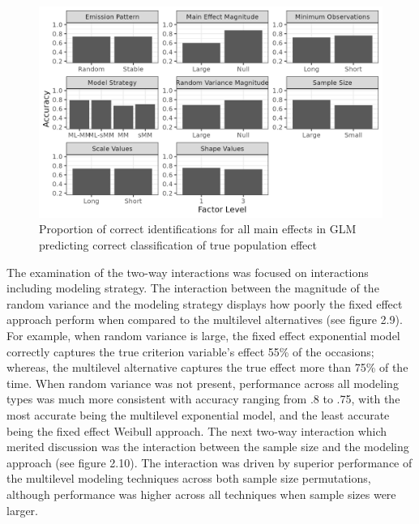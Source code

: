 \documentclass[12pt]{./styles/outhesis}
\begin{document}
\begin{figure}
\includegraphics{figures/glm1MainEffect.png}
\caption{Proportion of correct identifications for all main effects in
GLM predicting correct classification of true population effect}
\end{figure}

The examination of the two-way interactions was focused on interactions
including modeling strategy. The interaction between the magnitude of
the random variance and the modeling strategy displays how poorly the
fixed effect approach perform when compared to the multilevel
alternatives (see figure 2.9). For example, when random variance is
large, the fixed effect exponential model correctly captures the true
criterion variable's effect 55\% of the occasions; whereas, the
multilevel alternative captures the true effect more than 75\% of the
time. When random variance was not present, performance across all
modeling types was much more consistent with accuracy ranging from .8 to
.75, with the most accurate being the multilevel exponential model, and
the least accurate being the fixed effect Weibull approach. The next
two-way interaction which merited discussion was the interaction between
the sample size and the modeling approach (see figure 2.10). The
interaction was driven by superior performance of the multilevel
modeling techniques across both sample size permutations, although
performance was higher across all techniques when sample sizes were
larger.
\end{document}

